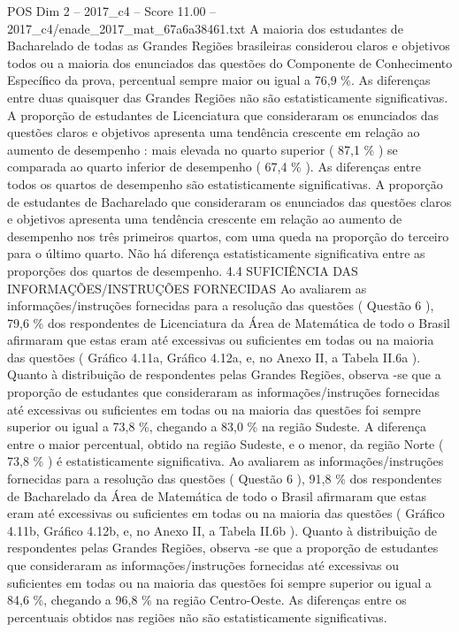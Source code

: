 \begin{textsample}{POS Dim 2 – 2017\_c4 – Score 11.00 – 2017\_c4/enade\_2017\_mat\_67a6a38461.txt}
A maioria dos estudantes de Bacharelado de todas as Grandes Regiões brasileiras considerou claros e objetivos todos ou a maioria dos enunciados das questões do Componente de Conhecimento Específico da prova, percentual sempre maior ou igual a 76,9 \%.
As diferenças entre duas quaisquer das Grandes Regiões não são estatisticamente significativas.
A proporção de estudantes de Licenciatura que consideraram os enunciados das questões claros e objetivos apresenta uma tendência crescente em relação ao aumento de desempenho : mais elevada no quarto superior ( 87,1 \% ) se comparada ao quarto inferior de desempenho ( 67,4 \% ).
As diferenças entre todos os quartos de desempenho são estatisticamente significativas.
A proporção de estudantes de Bacharelado que consideraram os enunciados das questões claros e objetivos apresenta uma tendência crescente em relação ao aumento de desempenho nos três primeiros quartos, com uma queda na proporção do terceiro para o último quarto.
Não há diferença estatisticamente significativa entre as proporções dos quartos de desempenho. 4.4 SUFICIÊNCIA DAS INFORMAÇÕES/INSTRUÇÕES FORNECIDAS Ao avaliarem as informações/instruções fornecidas para a resolução das questões ( Questão 6 ), 79,6 \% dos respondentes de Licenciatura da Área de Matemática de todo o Brasil afirmaram que estas eram até excessivas ou suficientes em todas ou na maioria das questões ( Gráfico 4.11a, Gráfico 4.12a, e, no Anexo II, a Tabela II.6a ).
Quanto à distribuição de respondentes pelas Grandes Regiões, observa -se que a proporção de estudantes que consideraram as informações/instruções fornecidas até excessivas ou suficientes em todas ou na maioria das questões foi sempre superior ou igual a 73,8 \%, chegando a 83,0 \% na região Sudeste.
A diferença entre o maior percentual, obtido na região Sudeste, e o menor, da região Norte ( 73,8 \% ) é estatisticamente significativa.
Ao avaliarem as informações/instruções fornecidas para a resolução das questões ( Questão 6 ), 91,8 \% dos respondentes de Bacharelado da Área de Matemática de todo o Brasil afirmaram que estas eram até excessivas ou suficientes em todas ou na maioria das questões ( Gráfico 4.11b, Gráfico 4.12b, e, no Anexo II, a Tabela II.6b ).
Quanto à distribuição de respondentes pelas Grandes Regiões, observa -se que a proporção de estudantes que consideraram as informações/instruções fornecidas até excessivas ou suficientes em todas ou na maioria das questões foi sempre superior ou igual a 84,6 \%, chegando a 96,8 \% na região Centro-Oeste.
As diferenças entre os percentuais obtidos nas regiões não são estatisticamente significativas.

\end{textsample}
